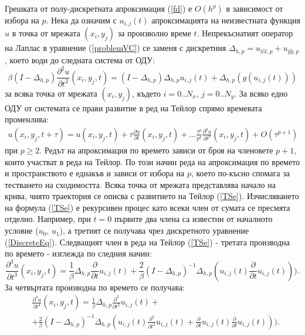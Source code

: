 \documentclass{article}
\newcommand{\be}{\begin{equation}}
\newcommand{\ee}{\end{equation}}
\newcommand{\rf}[1]{(\ref{#1})}
\begin{document}
Грешката от полу-дискретната апроксимация \rf{fd} е $O(h^p)$ в зависимост от избора на $p$. Нека да означим с $u_{i,j}(t)$ апроксимацията на неизвестната функция $u$ в точка от мрежата $(x_i, y_j)$ за произволно време $t$. Непрекъснатият оператор на Лаплас в уравнение \rf{problemVC} се заменя с дискретния $\Delta_{h,p} = u_{\widehat{xx},p} + u_{\widehat{yy},p}$, което води до следната система от ОДУ:
\be \label{DiscreteEq}
\beta (I-\Delta_{h,p}) \frac{\partial^2 u}{\partial t^2}(x_i, y_j, t)=
 (I - \Delta_{h,p})\Delta_{h,p} u_{i, j}(t) + \Delta_{h,p} ( g( u_{i, j}(t) ) )
\ee
за всяка точка от мрежата $(x_i, y_j)$, където $i = 0..N_x$, $j=0..N_y$. За всяко едно ОДУ от системата се прави развитие в ред на Тейлор спрямо времевата променлива:
\begin{align} \label{TSe}
u(x_i, y_j, t+\tau) = u(x_i, y_j, t) + \tau \frac{ \partial u }{ \partial t }(x_i, y_j, t)  + ... 
\frac{ \tau^p }{ p! } \frac{ \partial^p u }{ \partial t^p }(x_i, y_j, t) + O(\tau^{p+1})
\end{align}
при $p \ge 2$. Редът на апроксимация по времето зависи от броя на членовете $p+1$, които участват в реда на Тейлор. По този начин реда на апроксимация по времето и пространството е еднакъв и зависи от избора на $p$, което по-късно спомага за тестването на сходимостта. Всяка точка от мрежата представлява начало на крива, чиято траектория се описва с развитието на Тейлор \rf{TSe}. Изчисляването на формула \rf{TSe} е рекурсивен процес като всеки член от сумата се пресмята отделно. Например, при $t=0$ първите два члена са известни от началното условие ($u_0$, $u_1$), а третият се получава чрез дискретното уравнение \rf{DiscreteEq}.  Следващият член в реда на Тейлор \rf{TSe} - третата производна по времето - изглежда по следния начин:
\be \label{der3}
 \frac{\partial^3 u}{\partial t^3}(x_i, y_j, t) =
\frac{1}{\beta}\Delta_{h,p} \frac{\partial}{\partial t}u_{i, j}(t) + \frac{2}{\beta}(I-\Delta_{h,p})^{-1}\Delta_{h,p} ( u_{i, j}(t) \frac{\partial}{\partial t}u_{i, j}(t) ) ).
\ee
За четвъртата производна по времето се получава:
\begin{align} \label{der4}
&\frac{\partial^4 u}{\partial t^4}(x_i, y_j, t) = \frac{1}{\beta}\Delta_{h,p} \frac{\partial^2}{\partial t^2}u_{i, j}(t) +   \nonumber\\
&+ \frac{2}{\beta}(I-\Delta_{h,p})^{-1}\Delta_{h,p} (u_{i, j}(t)\frac{\partial^2}{\partial t^2}u_{i, j}(t) + \frac{\partial}{\partial t}u_{i, j}(t)\frac{\partial}{\partial t}u_{i, j}(t)  ) ).
\end{align}
\end{document}

